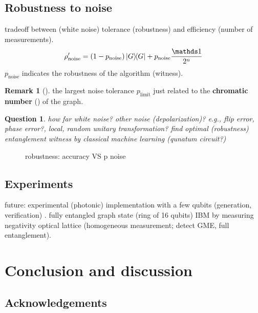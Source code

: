 \documentclass[
10pt,
aps,
pra,
linenumbers,
floatfix,
]{revtex4-2}
\theoremstyle{plain}
\newtheorem{question}{Question}
\theoremstyle{definition}
\newtheorem{remark}{Remark}
\newcommand{\noise}{\text{noise}}
\newcommand{\dm}{\rho}
\begin{document}
\subsection{Robustness to noise}
tradeoff between (white noise) tolerance (robustness) and efficiency (number of measurements).
\begin{equation}\label{eq:noisy_state}
	\dm_{\noise}' = (1-p_{\noise}) \op{G} + p_{\noise} \frac{\identity}{2^n}
\end{equation}
$p_{\noise}$ indicates the robustness of the algorithm (witness).
\begin{remark}[\cite{zhouDetectingMultipartiteEntanglement2019}]
	the largest noise tolerance $p_{\text{limit}}$ just related to the \textbf{chromatic number} () of the graph.
\end{remark}
\begin{question}
	how far white noise?
	other noise (depolarization)? e.g., flip error, phase error?, local, random unitary transformation?
find optimal (robustness) entanglement witness by classical machine learning (qunatum circuit?)
\end{question}
\begin{figure}[!ht]
	\centering
	\caption{robustness: accuracy VS p noise }
\end{figure}


\subsection{Experiments}
future: experimental (photonic) implementation with a few qubits (generation, verification) \cite{luEntanglementStructureEntanglement2018}.
fully entangled graph state (ring of 16 qubits) IBM by measuring negativity \cite{wang16qubitIBMUniversal2018}
optical lattice \cite{zhouSchemeCreateVerify2022} (homogeneous measurement; detect GME, full entanglement).

\section{Conclusion and discussion}

\subsection*{Acknowledgements}



%


\onecolumngrid
\appendix



\end{document}
